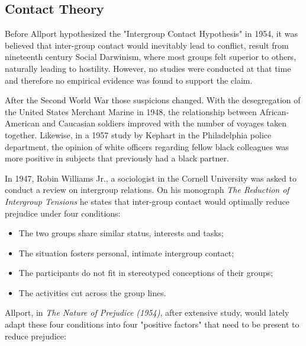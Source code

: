 \documentclass[runningheads]{llncs}
\begin{document}
\subsection{Contact Theory}
\par Before Allport hypothesized the "Intergroup Contact Hypothesis" in 1954, it was believed that inter-group contact would inevitably lead to conflict, result from nineteenth century Social Darwinism, where most groups felt superior to others, naturally leading to hostility. However, no studies were conducted at that time and therefore no empirical evidence was found to support the claim. 
\par After the Second World War those suspicions changed. With the desegregation of the United States Merchant Marine in 1948, the relationship between African-American and Caucasian soldiers improved with the number of voyages taken together. Likewise, in a 1957 study by Kephart in the Philadelphia police department, the opinion of white officers regarding fellow black colleagues was more positive in subjects that previously had a black partner.
\par In 1947, Robin Williams Jr., a sociologist in the Cornell University was asked to conduct a review on intergroup relations. On his monograph \textit{The Reduction of Intergroup Tensions} he states that inter-group contact would optimally reduce prejudice under four conditions:
\begin{itemize}
    \item The two groups share similar status, interests and tasks;
    \item The situation fosters personal, intimate intergroup contact;
    \item The participants do not fit in stereotyped conceptions of their groups;
    \item The activities cut across the group lines.
\end{itemize}
\par Allport, in \textit{The Nature of Prejudice (1954)}, after extensive study, would lately adapt these four conditions into four "positive factors" that need to be present to reduce prejudice:
\end{document}
